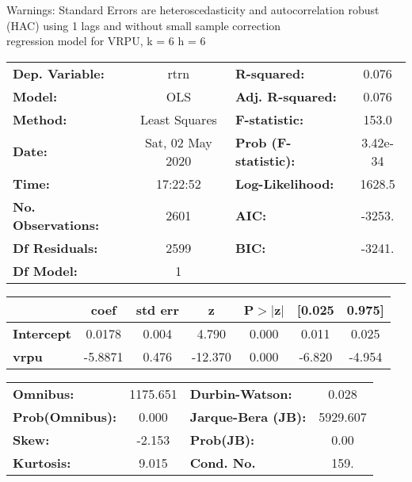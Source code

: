 Warnings: \newline
 [1] Standard Errors are heteroscedasticity and autocorrelation robust (HAC) using 1 lags and without small sample correction\\ 

regression model for VRPU, k = 6 h = 6\begin{center}
\begin{tabular}{lclc}
\toprule
\textbf{Dep. Variable:}    &       rtrn       & \textbf{  R-squared:         } &     0.076   \\
\textbf{Model:}            &       OLS        & \textbf{  Adj. R-squared:    } &     0.076   \\
\textbf{Method:}           &  Least Squares   & \textbf{  F-statistic:       } &     153.0   \\
\textbf{Date:}             & Sat, 02 May 2020 & \textbf{  Prob (F-statistic):} &  3.42e-34   \\
\textbf{Time:}             &     17:22:52     & \textbf{  Log-Likelihood:    } &    1628.5   \\
\textbf{No. Observations:} &        2601      & \textbf{  AIC:               } &    -3253.   \\
\textbf{Df Residuals:}     &        2599      & \textbf{  BIC:               } &    -3241.   \\
\textbf{Df Model:}         &           1      & \textbf{                     } &             \\
\bottomrule
\end{tabular}
\begin{tabular}{lcccccc}
                   & \textbf{coef} & \textbf{std err} & \textbf{z} & \textbf{P$> |$z$|$} & \textbf{[0.025} & \textbf{0.975]}  \\
\midrule
\textbf{Intercept} &       0.0178  &        0.004     &     4.790  &         0.000        &        0.011    &        0.025     \\
\textbf{vrpu}      &      -5.8871  &        0.476     &   -12.370  &         0.000        &       -6.820    &       -4.954     \\
\bottomrule
\end{tabular}
\begin{tabular}{lclc}
\textbf{Omnibus:}       & 1175.651 & \textbf{  Durbin-Watson:     } &    0.028  \\
\textbf{Prob(Omnibus):} &   0.000  & \textbf{  Jarque-Bera (JB):  } & 5929.607  \\
\textbf{Skew:}          &  -2.153  & \textbf{  Prob(JB):          } &     0.00  \\
\textbf{Kurtosis:}      &   9.015  & \textbf{  Cond. No.          } &     159.  \\
\bottomrule
\end{tabular}
\end{center}


